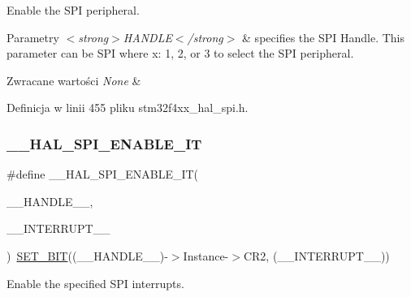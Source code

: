 Enable the S\+PI peripheral. 


\begin{DoxyParams}{Parametry}
{\em $<$strong$>$\+H\+A\+N\+D\+L\+E$<$/strong$>$} & specifies the S\+PI Handle. This parameter can be S\+PI where x\+: 1, 2, or 3 to select the S\+PI peripheral. \\
\hline
\end{DoxyParams}

\begin{DoxyRetVals}{Zwracane wartości}
{\em None} & \\
\hline
\end{DoxyRetVals}


Definicja w linii 455 pliku stm32f4xx\+\_\+hal\+\_\+spi.\+h.

\mbox{\label{group___s_p_i___exported___macros_ga76064652f6f56d8868720b5541e854f5}} 
\subsubsection{\texorpdfstring{\+\_\+\+\_\+\+H\+A\+L\+\_\+\+S\+P\+I\+\_\+\+E\+N\+A\+B\+L\+E\+\_\+\+IT}{\_\_HAL\_SPI\_ENABLE\_IT}}
{\footnotesize\ttfamily \#define \+\_\+\+\_\+\+H\+A\+L\+\_\+\+S\+P\+I\+\_\+\+E\+N\+A\+B\+L\+E\+\_\+\+IT(\begin{DoxyParamCaption}\item[{}]{\+\_\+\+\_\+\+H\+A\+N\+D\+L\+E\+\_\+\+\_\+,  }\item[{}]{\+\_\+\+\_\+\+I\+N\+T\+E\+R\+R\+U\+P\+T\+\_\+\+\_\+ }\end{DoxyParamCaption})~\hyperlink{group___exported__macro_ga26474f43799fbade9cf300e21dd3a91a}{S\+E\+T\+\_\+\+B\+IT}((\+\_\+\+\_\+\+H\+A\+N\+D\+L\+E\+\_\+\+\_\+)-\/$>$Instance-\/$>$C\+R2, (\+\_\+\+\_\+\+I\+N\+T\+E\+R\+R\+U\+P\+T\+\_\+\+\_\+))}



Enable the specified S\+PI interrupts. 


